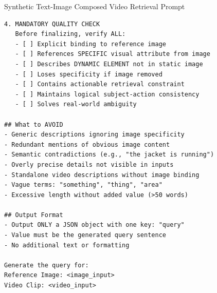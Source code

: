 \begin{promptbox}{Synthetic Text-Image Composed Video Retrieval Prompt}
\begin{lstlisting}[style=promptstyle]
4. MANDATORY QUALITY CHECK
   Before finalizing, verify ALL:
   - [ ] Explicit binding to reference image
   - [ ] References SPECIFIC visual attribute from image
   - [ ] Describes DYNAMIC ELEMENT not in static image
   - [ ] Loses specificity if image removed
   - [ ] Contains actionable retrieval constraint
   - [ ] Maintains logical subject-action consistency
   - [ ] Solves real-world ambiguity

## What to AVOID
- Generic descriptions ignoring image specificity
- Redundant mentions of obvious image content
- Semantic contradictions (e.g., "the jacket is running")
- Overly precise details not visible in inputs
- Standalone video descriptions without image binding
- Vague terms: "something", "thing", "area"
- Excessive length without added value (>50 words)

## Output Format
- Output ONLY a JSON object with one key: "query"
- Value must be the generated query sentence
- No additional text or formatting

Generate the query for:
Reference Image: <image_input>
Video Clip: <video_input>
\end{lstlisting}
\end{promptbox}

